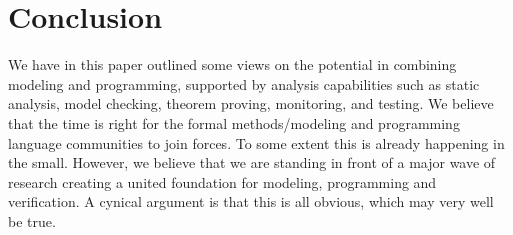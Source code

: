 
\section{Conclusion}
\label{sec:conclusion}

We have in this paper outlined some views on the potential in 
combining modeling and programming, supported by analysis 
capabilities such as static analysis, model checking, theorem 
proving, monitoring, and testing. We believe that the time is right 
for the formal methods/modeling and programming language 
communities to join forces. To some extent this is already 
happening in the small. However, we believe that we are standing in 
front of a major wave of research creating a united foundation for 
modeling, programming and verification. A cynical argument is that 
this is all obvious, which may very well be true. 